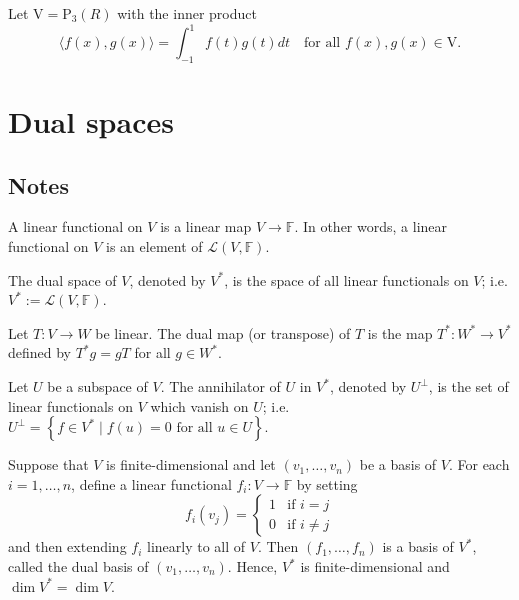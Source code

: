 \documentclass{report}
\begin{document}
    \begin{Example}
        Let $\mathrm{V}=\mathrm{P}_{3}(R)$ with the inner product
        $$
        \langle f(x), g(x)\rangle=\int_{-1}^{1} f(t) g(t) d t \quad \text{for all } f(x), g(x) \in \mathrm{V}.
        $$
    \end{Example}


    \chapter{Dual spaces}
    \section{Notes}
    \begin{defBox}
        A linear functional on $V$ is a linear map $V \rightarrow \mathbb{F}$. In other words, a linear functional on $V$ is an element of $\mathcal{L}(V, \mathbb{F})$.
        \end{defBox}

        \begin{defBox}
        The dual space of $V$, denoted by $V^{*}$, is the space of all linear functionals on $V$; i.e. $V^{*} := \mathcal{L}(V, \mathbb{F})$.
        \end{defBox}

        \begin{defBox}
        Let $T: V \rightarrow W$ be linear. The dual map (or transpose) of $T$ is the map $T^{*}: W^{*} \rightarrow V^{*}$ defined by $T^{*} g = g T$ for all $g \in W^{*}$.
        \end{defBox}

        \begin{defBox}
        Let $U$ be a subspace of $V$. The annihilator of $U$ in $V^{*}$, denoted by $U^{\perp}$, is the set of linear functionals on $V$ which vanish on $U$; i.e. $U^{\perp} = \left\{ f \in V^{*} \mid f(u) = 0 \text{ for all } u \in U \right\}$.
        \end{defBox}

        \begin{thBox}
        Suppose that $V$ is finite-dimensional and let $\left(v_{1}, \ldots, v_{n}\right)$ be a basis of $V$. For each $i = 1, \ldots, n$, define a linear functional $f_{i}: V \rightarrow \mathbb{F}$ by setting
        $$
        f_{i}\left(v_{j}\right) = \begin{cases}
        1 & \text{if } i = j \\
        0 & \text{if } i \neq j
        \end{cases}
        $$
        and then extending $f_{i}$ linearly to all of $V$. Then $\left(f_{1}, \ldots, f_{n}\right)$ is a basis of $V^{*}$, called the dual basis of $\left(v_{1}, \ldots, v_{n}\right)$. Hence, $V^{*}$ is finite-dimensional and $\dim V^{*} = \dim V$.
        \end{thBox}
\end{document}
